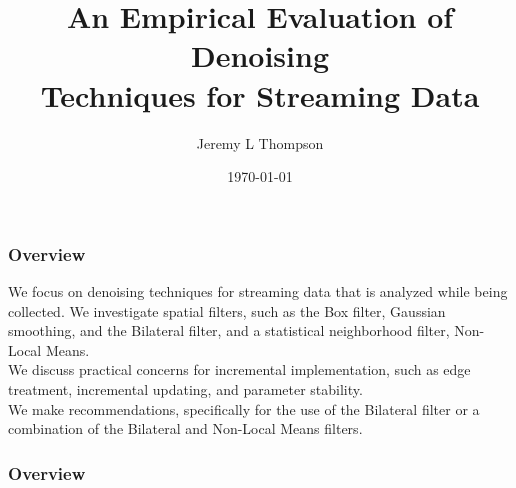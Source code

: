 \documentclass{beamer}
\title[Streaming Data Denoising]{An Empirical Evaluation of Denoising\\Techniques for Streaming Data} %
\author{Jeremy L Thompson} %
\institute[USAFA/LLNL] %
{
United States Air Force Academy\\
Lawrence Livermore National Laboratory\\ %
\medskip
\textit{jeremy.thompson@usafa.edu} %
}
\date{\today} %
\begin{document}
\begin{frame}
\titlepage %
\end{frame}


\begin{frame}
\begin{center}
\frametitle{Overview}

\justifying

We focus on denoising techniques for streaming data that is analyzed while being collected. We investigate spatial filters, such as the Box filter, Gaussian smoothing, and the Bilateral filter, and a statistical neighborhood filter, Non-Local Means.\\

$ $\\

We discuss practical concerns for incremental implementation, such as edge treatment, incremental updating, and parameter stability.\\

$ $\\

We make recommendations, specifically for the use of the Bilateral filter or a combination of the Bilateral and Non-Local Means filters.

\end{center}
\end{frame}
 

\begin{frame}
\frametitle{Overview} %
\tableofcontents %
\end{frame}

\end{document}
